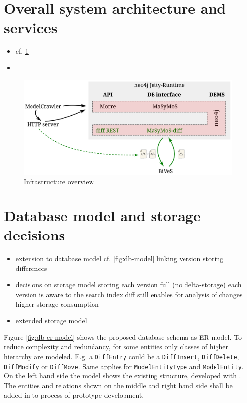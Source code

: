 \section{Overall system architecture and services}
\begin{itemize}
	\item cf. \ref{fig:system-overview}
	\item {}
\end{itemize}

\begin{figure}[h]
	\centering
	\includegraphics[width=\textwidth]{resources/system-overview-matrix.pdf}
	\caption{Infrastructure overview}
	\label{fig:system-overview}
\end{figure}

\section{Database model and storage decisions}
\begin{itemize}
\item extension to database model cf. \ref{fig:db-model}
	\subitem linking version
	\subitem storing differences
\item decisions on storage model
	\subitem storing each version full (no delta-storage)
	\subitem each version is aware to the search index
	\subitem diff still enables for analysis of changes
	\subitem higher storage consumption
\item extended storage model
\end{itemize}
Figure \ref{fig:db-er-model} shows the proposed database schema as ER model. To reduce complexity and redundancy, for some entities only classes of higher hierarchy are modeled. E.g. a \texttt{DiffEntry} could be a \texttt{DiffInsert}, \texttt{DiffDelete}, \texttt{DiffModify} or \texttt{DiffMove}. Same applies for \texttt{ModelEntityType} and \texttt{ModelEntity}.
On the left hand side the model shows the existing structure, developed with \masymos. The entities and relations shown on the middle and right hand side shall be added in to process of prototype development.

